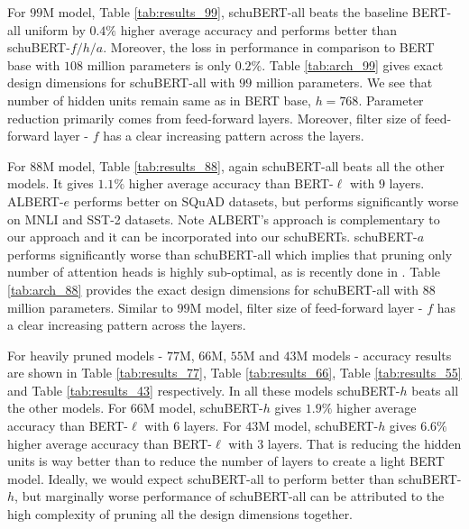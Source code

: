 \documentclass[11pt,a4paper]{article}
\begin{document}
For $99$M model, Table \ref{tab:results_99}, schuBERT-all beats the baseline BERT-all uniform by $0.4\%$ higher average accuracy and performs better than schuBERT-$f/h/a$. Moreover, the loss in performance in comparison to BERT base with $108$ million parameters is only $0.2\%$. Table \ref{tab:arch_99} gives exact design dimensions for schuBERT-all with $99$ million parameters. We see that number of hidden units remain same as in BERT base, $h=768$. Parameter reduction primarily comes from feed-forward layers. Moreover, filter size of feed-forward layer - $f$ has a clear increasing pattern across the layers.  

For $88$M model, Table \ref{tab:results_88}, again schuBERT-all beats all the other models.  It gives $1.1\%$ higher average accuracy than BERT-$\ell$ with $9$ layers. ALBERT-$e$ performs better on SQuAD datasets, but performs significantly worse on MNLI and SST-2 datasets. Note ALBERT's approach is complementary to our approach and it can be incorporated into our schuBERTs.
schuBERT-$a$ performs significantly worse than schuBERT-all which implies that pruning only number of attention heads is highly sub-optimal, as is recently done in \citet{michel2019sixteen}. 
Table \ref{tab:arch_88} provides the exact design dimensions for schuBERT-all with $88$ million parameters. Similar to $99$M model, filter size of feed-forward layer - $f$ has a clear increasing pattern across the layers.  


For heavily pruned models - $77$M, $66$M, $55$M and $43$M models - accuracy results are shown in Table \ref{tab:results_77}, Table \ref{tab:results_66}, Table \ref{tab:results_55} and Table \ref{tab:results_43} respectively. In all these models 
schuBERT-$h$ beats all the other models. For $66$M model, schuBERT-$h$ gives $1.9\%$ higher average accuracy than BERT-$\ell$ with $6$ layers. For $43$M model, schuBERT-$h$ gives $6.6\%$ higher average accuracy than BERT-$\ell$ with $3$ layers. That is reducing the hidden units is way better than to reduce the number of layers to create a light BERT model. Ideally, we would expect schuBERT-all to perform better than schuBERT-$h$, but marginally worse performance of schuBERT-all can be attributed to the high complexity of pruning all the design dimensions together. 
\end{document}
